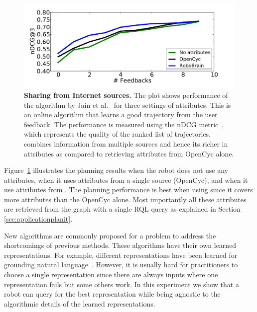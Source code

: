 \begin{figure}
\centering
\includegraphics[width=\linewidth]{Image/internet_attributes}
\caption{\textbf{Sharing from Internet sources.} The plot shows performance of  the algorithm by Jain et al.~\citep{jainsaxena2013_trajectorypreferences} for three settings of attributes. This is an online algorithm that learns a good trajectory from the user feedback. The performance is measured using the nDCG metric~\cite{manning2008introduction}, which represents the quality of the ranked list of trajectories. \robobrain{} combines information from multiple sources and hence its richer in attributes as compared to retrieving attributes from OpenCyc alone.}
\label{fig:ndcg}
\end{figure}

Figure~\ref{fig:ndcg} illustrates the planning results when the robot does not use any attributes, when it uses attributes from a single source (OpenCyc), and when it use attributes from \robobrain{}. The planning performance is best when using \robobrain{} since it covers more attributes than the OpenCyc alone. Most importantly all these attributes are retrieved from the \robobrain{} graph with a single RQL query as explained in Section \ref{sec:applicationplanit}.
\fi


New algorithms are commonly proposed for a problem to address the shortcomings of previous methods. These algorithms have their own learned representations. For example,  different representations  have been learned for grounding natural language~\citep{tellex2011understanding,misra2014tell,guadarrama2013grounding, MatuszekISER2012}. However, it is usually hard for practitioners to choose a single representation since there are always inputs where one representation fails but some others work. In this experiment we show that a robot can query \robobrain{} for the best representation while being agnostic to the algorithmic details of the learned representations.

